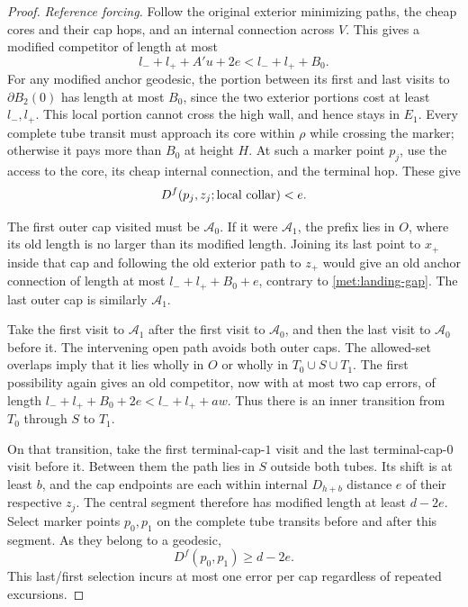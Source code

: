 \begin{proof}
\emph{Reference forcing.}
Follow the original exterior minimizing paths, the cheap cores and
their cap hops, and an internal connection across $V$.  This gives a
modified competitor of length at most
\begin{equation}
 l_-+l_++A'u+2e<l_-+l_++B_0.
 \label{met:gate-budget}
\end{equation}
For any modified anchor geodesic, the portion between its first and
last visits to $\partial B_2(0)$ has length at most $B_0$, since the
two exterior portions cost at least $l_-,l_+$.  This local portion
cannot cross the high wall, and hence stays in $E_1$.  Every complete
tube transit must approach its core within $\rho$ while crossing the
marker; otherwise it pays more than $B_0$ at height $H$.
At such a marker point $p_j$, use the access to the core, its cheap
internal connection, and the terminal hop.  These give
\begin{equation}
 D^f(p_j,z_j;\hbox{local collar})<e.
 \label{met:gate-access}
\end{equation}

The first outer cap visited must be $\mathcal A_0$.  If it were
$\mathcal A_1$, the prefix lies in $O$, where its old length is no
larger than its modified length.  Joining its last point to $x_+$
inside that cap and following the old exterior path to $z_+$ would
give an old anchor connection of length at most
$l_-+l_++B_0+e$, contrary to \eqref{met:landing-gap}.
The last outer cap is similarly $\mathcal A_1$.

Take the first visit to $\mathcal A_1$ after the first visit to
$\mathcal A_0$, and then the last visit to $\mathcal A_0$ before it.
The intervening open path avoids both outer caps.  The allowed-set
overlaps imply that it lies wholly in $O$ or wholly in
$T_0\cup S\cup T_1$.  The first possibility again gives an old
competitor, now with at most two cap errors, of length
$l_-+l_++B_0+2e<l_-+l_++aw$.  Thus there is an inner transition
from $T_0$ through $S$ to $T_1$.

On that transition, take the first terminal-cap-$1$ visit and the
last terminal-cap-$0$ visit before it.  Between them the path lies
in $S$ outside both tubes.  Its shift is at least $b$, and the cap
endpoints are each within internal $D_{h+b}$ distance $e$ of their
respective $z_j$.  The central segment therefore has modified length
at least $d-2e$.  Select marker points $p_0,p_1$ on the complete tube
transits before and after this segment.  As they belong to a
geodesic,
\[
 D^f(p_0,p_1)\geq d-2e.
\]
This last/first selection incurs at most one error per cap regardless
of repeated excursions.


\end{proof}

